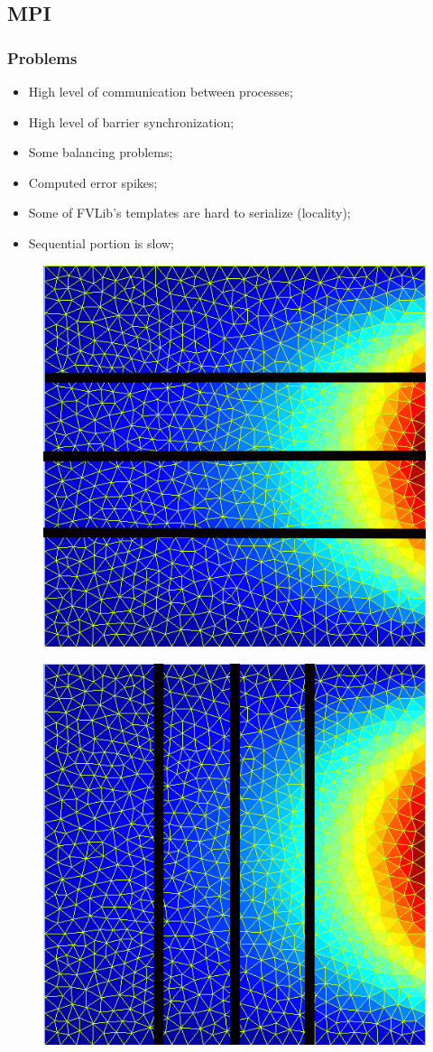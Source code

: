 \documentclass{beamer}
\begin{document}
\subsection{MPI} 

\begin{frame}
	\frametitle{Problems}
	\begin{itemize}		
		\item High level of communication between processes;
		\item High level of barrier synchronization;
		\item Some balancing problems;
		\item Computed error spikes;
		\item Some of FVLib's templates are hard to serialize (locality);
		\item Sequential portion is slow;
	\end{itemize}		
\end{frame}



\begin{frame}
	\begin{figure}[!htp]
    	\centering   
        \includegraphics[width=.6\textwidth]{../images/meshhorizontal.png}        
	\end{figure}
\end{frame}

\begin{frame}
	\begin{figure}[!htp]
    	\centering   
        \includegraphics[width=.6\textwidth]{../images/mesh_vertical.png}        
	\end{figure}
\end{frame}
\end{document}
